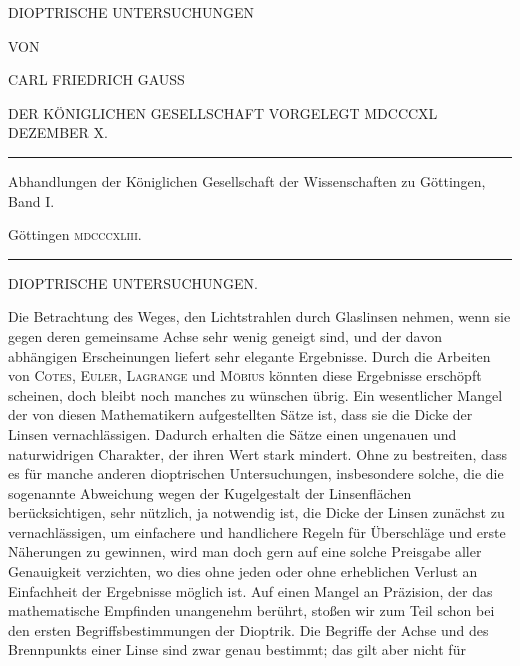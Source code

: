 \clearpage
\thispagestyle{empty}
\begin{center}
\vspace*{0.6in}
{\Large DIOPTRISCHE UNTERSUCHUNGEN\par}
\vspace{0.6in}
VON\par
\vspace{0.5in}
{\large CARL FRIEDRICH GAUSS\par}
\vspace{0.4in}
DER KÖNIGLICHEN GESELLSCHAFT VORGELEGT MDCCCXL DEZEMBER X.\par
\vfill
\rule{0.85\textwidth}{0.3pt}\par
Abhandlungen der Königlichen Gesellschaft der Wissenschaften zu Göttingen, Band I.\par
Göttingen \textsc{mdcccxliii}.\par
\rule{0.85\textwidth}{0.3pt}
\end{center}
\clearpage
{}
\renewcommand{\Article}[1]{\par\medskip\Needspace{4\baselineskip}\pdfbookmark[1]{Art. #1}{dioptrische-art-#1}\centerline{\textbf{#1.}}\nobreak\smallskip}
\begin{center}
DIOPTRISCHE UNTERSUCHUNGEN.
\end{center}
\medskip
Die Betrachtung des Weges, den Lichtstrahlen durch Glaslinsen nehmen, wenn sie gegen deren gemeinsame Achse sehr wenig geneigt sind, und der davon abhängigen Erscheinungen liefert sehr elegante Ergebnisse. Durch die Arbeiten von \textsc{Cotes}, \textsc{Euler}, \textsc{Lagrange} und \textsc{Möbius} könnten diese Ergebnisse erschöpft scheinen, doch bleibt noch manches zu wünschen übrig. Ein wesentlicher Mangel der von diesen Mathematikern aufgestellten Sätze ist, dass sie die Dicke der Linsen vernachlässigen. Dadurch erhalten die Sätze einen ungenauen und naturwidrigen Charakter, der ihren Wert stark mindert. Ohne zu bestreiten, dass es für manche anderen dioptrischen Untersuchungen, insbesondere solche, die die sogenannte Abweichung wegen der Kugelgestalt der Linsenflächen berücksichtigen, sehr nützlich, ja notwendig ist, die Dicke der Linsen zunächst zu vernachlässigen, um einfachere und handlichere Regeln für Überschläge und erste Näherungen zu gewinnen, wird man doch gern auf eine solche Preisgabe aller Genauigkeit verzichten, wo dies ohne jeden oder ohne erheblichen Verlust an Einfachheit der Ergebnisse möglich ist. Auf einen Mangel an Präzision, der das mathematische Empfinden unangenehm berührt, stoßen wir zum Teil schon bei den ersten Begriffsbestimmungen der Dioptrik. Die Begriffe der Achse und des Brennpunkts einer Linse sind zwar genau bestimmt; das gilt aber nicht für
